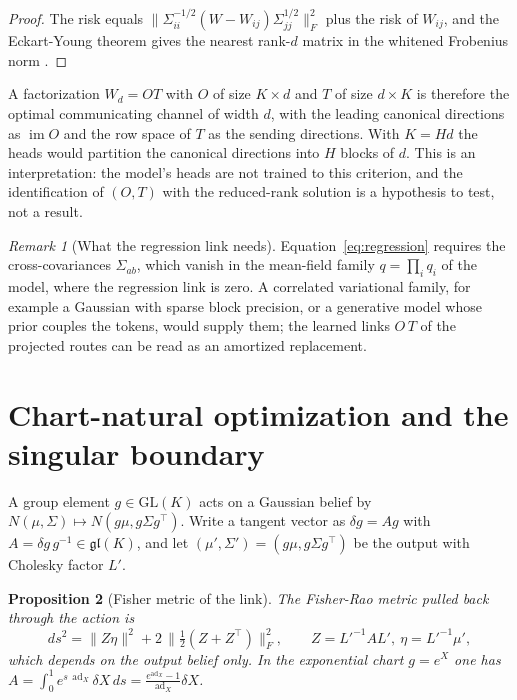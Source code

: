 \documentclass[11pt]{article}
\newtheorem{proposition}{Proposition}
\theoremstyle{definition}
\theoremstyle{remark}
\newtheorem{remark}[proposition]{Remark}
\newcommand{\GL}{\mathrm{GL}}
\newcommand{\gl}{\mathfrak{gl}}
\newcommand{\ad}{\operatorname{ad}}
\begin{document}
\begin{proof}
The risk equals $\|\Sigma_{ii}^{-1/2}(W-W_{ij})\Sigma_{jj}^{1/2}\|_F^2$ plus the risk of $W_{ij}$, and the Eckart-Young theorem gives the nearest rank-$d$ matrix in the whitened Frobenius norm \cite{izenman1975,reinsel1998}.
\end{proof}

A factorization $W_d=OT$ with $O$ of size $K\times d$ and $T$ of size $d\times K$ is therefore the optimal communicating channel of width $d$, with the leading canonical directions as $\operatorname{im}O$ and the row space of $T$ as the sending directions. With $K=Hd$ the heads would partition the canonical directions into $H$ blocks of $d$. This is an interpretation: the model's heads are not trained to this criterion, and the identification of $(O,T)$ with the reduced-rank solution is a hypothesis to test, not a result.

\begin{remark}[What the regression link needs]
Equation~\eqref{eq:regression} requires the cross-covariances $\Sigma_{ab}$, which vanish in the mean-field family $q=\prod_iq_i$ of the model, where the regression link is zero. A correlated variational family, for example a Gaussian with sparse block precision, or a generative model whose prior couples the tokens, would supply them; the learned links $O\,T$ of the projected routes can be read as an amortized replacement.
\end{remark}

\section{Chart-natural optimization and the singular boundary}
\label{sec:natural}

A group element $g\in\GL(K)$ acts on a Gaussian belief by $N(\mu,\Sigma)\mapsto N(g\mu,g\Sigma g^\top)$. Write a tangent vector as $\delta g=Ag$ with $A=\delta g\,g^{-1}\in\gl(K)$, and let $(\mu',\Sigma')=(g\mu,g\Sigma g^\top)$ be the output with Cholesky factor $L'$.

\begin{proposition}[Fisher metric of the link]
\label{prop:fisher}
The Fisher-Rao metric pulled back through the action is
\begin{equation}
ds^2=\|Z\eta\|^2+2\,\|\tfrac12(Z+Z^\top)\|_F^2,\qquad Z=L'^{-1}AL',\ \eta=L'^{-1}\mu',
\label{eq:fisher}
\end{equation}
which depends on the output belief only. In the exponential chart $g=e^{X}$ one has $A=\int_0^1e^{s\,\ad_X}\delta X\,ds=\frac{e^{\ad_X}-1}{\ad_X}\delta X$.
\end{proposition}
\end{document}
